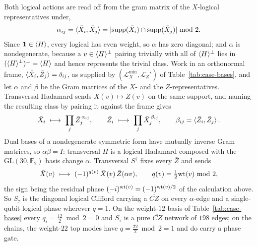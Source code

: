 Both logical actions are read off from the gram matrix of the $X$-logical representatives under,
\begin{equation}\label{eq:case-alpha}
    \alpha_{ij}=\braket{\bar X_i,\bar X_j}
    =|\mathrm{supp}(\bar X_i)\cap\mathrm{supp}(\bar X_j)|\ \mathrm{mod}\ 2 .
\end{equation}
Since $\mathbf 1\in\langle H \rangle$, every logical has even weight, so $\alpha$ has zero diagonal; and $\alpha$ is nondegenerate, because a $v\in\langle H \rangle^\perp$ pairing trivially with all of $\langle H \rangle^\perp$ lies in $(\langle H \rangle^\perp)^{\perp}=\langle H \rangle$ and hence represents the trivial class.  Work in an orthonormal frame, $\braket{\bar X_i,\bar Z_j}=\delta_{ij}$, as supplied by $(\mathcal{L}_X^{\min},\mathcal{L}_Z')$ of Table~\ref{tab:case-bases}, and let $\alpha$ and $\beta$ be the Gram matrices of the $X$- and the $Z$-representatives.  Transversal Hadamard sends $X(v)\mapsto Z(v)$ on the same support, and naming the resulting class by pairing it against the frame gives
\begin{equation}\label{eq:case-H}
    \bar X_i\ \longmapsto\ \prod_j\bar Z_j^{\,\alpha_{ij}},\qquad
    \bar Z_i\ \longmapsto\ \prod_j\bar X_j^{\,\beta_{ij}},\qquad
    \beta_{ij}=\braket{\bar Z_i,\bar Z_j}.
\end{equation}
Dual bases of a nondegenerate symmetric form have mutually inverse Gram matrices, so
$\alpha\beta=I$: transversal $H$ is a logical Hadamard composed with the
$\mathrm{GL}(30,\mathbb{F}_2)$ basis change $\alpha$.  Transversal $S^\dagger$ fixes every
$\bar Z$ and sends
\begin{equation}\label{eq:case-S}
    \bar X(v)\ \longmapsto\ (-1)^{q(v)}\,\bar X(v)\,\bar Z(\alpha v),\qquad
    q(v)=\tfrac12\mathrm{wt}(v)\ \mathrm{mod}\ 2 ,
\end{equation}
the sign being the residual phase $(-i)^{\mathrm{wt}(v)}=(-1)^{\mathrm{wt}(v)/2}$ of the calculation above.  So
$S_\tau$ is the diagonal logical Clifford carrying a $\overline{CZ}$ on every $\alpha$-edge and a
single-qubit logical phase wherever $q=1$.  On the weight-$12$ basis of
Table~\ref{tab:case-bases} every $q_i=\tfrac{12}2\bmod 2=0$ and $S_\tau$ is a pure
$\overline{CZ}$ network of $198$ edges; on the chains, the weight-$22$ top modes have
$q=\tfrac{22}2\bmod2=1$ and do carry a phase gate.
